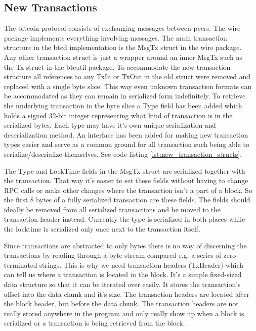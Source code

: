 \documentclass[12pt]{article}
\begin{document}
\subsection{New Transactions}\label{subsec:new_transactions}
The bitcoin protocol consists of exchanging messages between peers. The wire package implements everything involving messages. The main transaction structure in the btcd implementation is the MsgTx struct in the wire package. Any other transaction struct is just a wrapper around an inner MsgTx such as the Tx struct in the btcutil package.
To accommodate the new transaction structure all references to any TxIn or 
TxOut in the old struct were removed and replaced with a single byte slice. This way even unknown transaction formats can be accommodated as they can remain in serialized form indefinitely. To retrieve the underlying transaction in the byte slice a Type field has been added which holds a signed 32-bit integer representing what kind of transaction is in the serialized bytes. Each type may have it's own unique serialization and deserialization method. An interface has been added for making new transaction types easier and serve as a common ground for all transaction such being able to serialize/deserialize themselves. See code listing \ref{lst:new_transaction_structs}.

The Type and LockTime fields in the MsgTx struct are serialized together with the transaction. That way it's easier to set these fields without having to change RPC calls or make other changes where the transaction isn't a part of a block. So the first 8 bytes of a fully serialized transaction are these fields. The fields should ideally be removed from all serialized transactions and be moved to the transaction header instead. Currently the type is serialized in both places while the locktime is serialized only once next to the transaction itself.

Since transactions are abstracted to only bytes there is no way of discerning the transactions by reading through a byte stream compared e.g. a series of zero-terminated strings. This is why we need transaction headers (TxHeader) which can tell us where a transaction is located in the block. It's a simple fixed-sized data structure so that it can be iterated over easily. It stores the transaction's offset into the data chunk and it's size. The transaction headers are located after the block header, but before the data chunk. The transaction headers are not really stored anywhere in the program and only really show up when a block is serialized or a transaction is being retrieved from the block.
\end{document}
